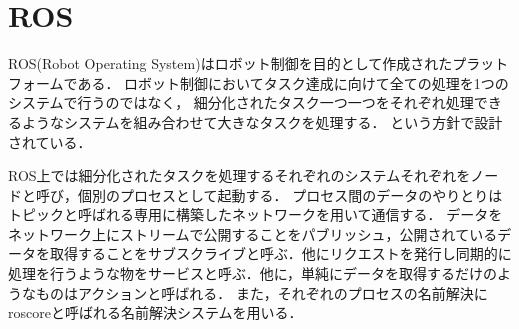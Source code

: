 \section{ROS}
ROS(Robot Operating System)はロボット制御を目的として作成されたプラットフォームである．
ロボット制御においてタスク達成に向けて全ての処理を1つのシステムで行うのではなく，
細分化されたタスク一つ一つをそれぞれ処理できるようなシステムを組み合わせて大きなタスクを処理する．
という方針で設計されている．

ROS上では細分化されたタスクを処理するそれぞれのシステムそれぞれをノードと呼び，個別のプロセスとして起動する．
プロセス間のデータのやりとりはトピックと呼ばれる専用に構築したネットワークを用いて通信する．
データをネットワーク上にストリームで公開することをパブリッシュ，公開されているデータを取得することをサブスクライブと呼ぶ．他にリクエストを発行し同期的に処理を行うような物をサービスと呼ぶ．他に，単純にデータを取得するだけのようなものはアクションと呼ばれる．
また，それぞれのプロセスの名前解決にroscoreと呼ばれる名前解決システムを用いる．
